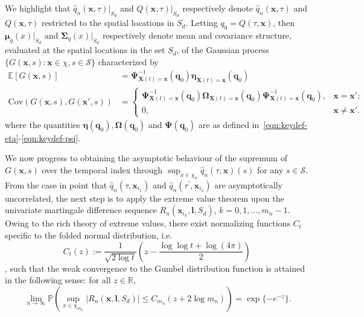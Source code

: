 \documentclass[aos]{imsart}
\theoremstyle{plain}
\theoremstyle{remark}
\def\E{\mathbb{E}}
\newcommand{\Scal}{\mathcal{S}}
\newcommand{\dash}{^{\prime}}
\newcommand{\bb}[1]{\boldsymbol{#1}}
\newcommand{\prob}{\mathbb{P}}
\newcommand{\cnam}[1]{\textcolor{mypurple}{#1}}
\begin{document}
\noindent We highlight that $\hat{q}_n(\bb{x}, \tau)\vert_{S_d}$ and $ Q(\bb{x}, \tau)\vert_{S_d}$ respectively denote $\hat{q}_n(\bb{x}, \tau)$ and $Q(\bb{x}, \tau)$ restricted to the spatial locations in $S_d$. Letting $q_0 = Q(\tau, \bb{x})$, then $\bb{\mu}_q(x)\vert_{S_d}$ and $\bb{\Sigma}_q(x)\vert_{S_d}$ respectively denote mean and covariance structure, evaluated at the spatial locations in the set $S_d$, of the Gaussian process $\{ G(\bb{x}, s) : \bb{x} \in \chi, s \in \Scal \}$ characterized by
\begin{equation}
	\begin{split}
	\E\left[ G(\bb{x}, s) \right] & = \bb{\Psi}_{\bb{X}(t) = \bb{x}}^{-1}(\bb{q}_0) \bb{\eta}_{\bb{X}(t) = \bb{x}}(\bb{q}_0) \\
	\text{Cov}\left( G(\bb{x}, s), G(\bb{x}', s) \right) & = \begin{cases}
        \bb{\Psi}_{\bb{X}(t) = \bb{x}}^{-1}(\bb{q}_0) \bb{\Omega}_{\bb{X}(t) = \bb{x}}(\bb{q}_0) \bb{\Psi}_{\bb{X}(t) = \bb{x}}^{-1} (\bb{q}_0), & \bb{x} = \bb{x}'; \\
        0, & \bb{x} \neq \bb{x}'.
    \end{cases}
	\end{split}
\end{equation}
\noindent where the quantities $\bb{\eta}(\bb{q}_0), \bb{\Omega}(\bb{q}_0)$ and $\bb{\Psi}(\bb{q}_0)$ are as defined in~\eqref{eqn:keydef-eta}-\eqref{eqn:keydef-psi}.

\cnam{We now progress to obtaining the asymptotic behaviour of the supremum} of $G(\bb{x}, s)$ over the temporal index through $\sup_{x\in \chi_n} \hat{q}_n(\tau, \bb{x})(s)$ for any $s \in \Scal$.  From the case in point that $\hat{q}_n(\tau, \bb{x}_{i_1})$ and $\hat{q}_n(\tau\dash, \bb{x}_{i_2})$ are asymptotically uncorrelated, the next step is to apply %
the extreme value theorem upon the  univariate martingale difference sequence $R_n(\bb{x}_{i_k}, \bb{l}, S_d)$, $k = 0, 1, \dots,m_{n} - 1$. Owing to the rich theory of extreme values, there exist normalizing functions $ C_t$ specific to the folded normal distribution, i.e.
\begin{equation}
    C_t(z) := \frac{1}{\sqrt{2\log t}}  \left( z -  \frac{\log \log t  + \log(4 \pi)}{2} \right)
    \label{eqn:NormingBn}
\end{equation}
\citep[see][p.72]{Resnick1987}, such that the weak convergence to the Gumbel distribution function is attained in the following sense: for all $z \in \mathbb{R}$,
\begin{equation}
    \ \lim_{n\rightarrow \infty} \prob\left( \sup_{x \in \chi_{m_{n}}} \vert R_n(\bb{x}, \bb{l}, S_d) \vert \leq C_{m_{n}}(z + 2 \log m_{n} ) \right)  = \exp\{  -e^{-z}\}.
    \label{eqn:conf-1}
\end{equation}
\end{document}
